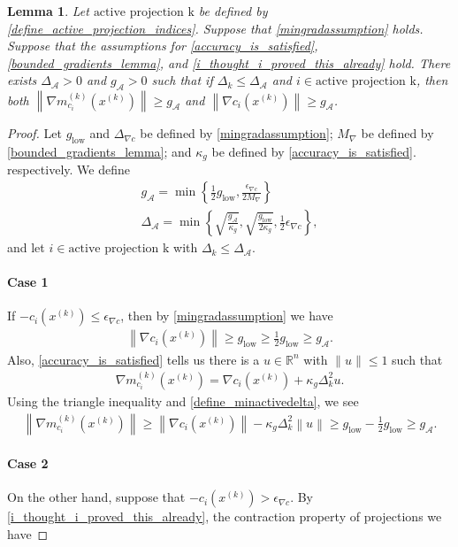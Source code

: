 \documentclass{article}
\newtheorem{lemma}[theorem]{Lemma}
\theoremstyle{case}
\numberwithin{theorem}{subsection}
\newcommand{\dk}{\Delta_k}
\newcommand{\gmcik}{{\nabla m_{c_i}^{(k)}\left(\xk\right)}}
\newcommand{\maxgrad}{{M_{\nabla}}}
\newcommand{\minactivegraddelta}{{\Delta_{\mathcal A}}}
\newcommand{\minactivegrad}{{ g_{\mathcal A} }}
\newcommand{\mingraddelta}{{\Delta_{\nabla c}}}
\newcommand{\mingradepsilon}{{\epsilon_{\nabla c}}}
\newcommand{\mingrad}{{ g_{\textrm{low}} }}
\newcommand{\Rn}{\mathbb R^n}
\newcommand{\xk}{x^{(k)}}
\newcommand{\activeprojk}{{\textrm{active projection k}}}
\begin{document}
\begin{lemma}
\label{active_gradients_bounded_below}
Let $\activeprojk$ be defined by \cref{define_active_projection_indices}.
Suppose that \cref{mingradassumption} holds.
Suppose that the assumptions for 
\cref{accuracy_is_satisfied}, \cref{bounded_gradients_lemma}, and \cref{i_thought_i_proved_this_already} hold.
There exists $\minactivegraddelta > 0$ and $\minactivegrad > 0$ such that if 
$\dk \le \minactivegraddelta$ and $i \in \activeprojk$, then both
$\left\|\gmcik\right\| \ge \minactivegrad$
and
$\left\|\nabla c_i\left(\xk\right)\right\| \ge \minactivegrad$.
\end{lemma}
\begin{proof}
Let 
$\mingrad$ and $\mingraddelta$
be defined by
\cref{mingradassumption};
$\maxgrad$ be defined by \cref{bounded_gradients_lemma};
and $\kappa_g$ be defined by \cref{accuracy_is_satisfied}.
respectively.
We define
\begin{align}
\minactivegrad = \min\left\{\frac 1 2 \mingrad, \frac {\mingradepsilon} {2 \maxgrad}  \right\} \label{define_minactivegrad} \\
\minactivegraddelta = \min\left\{\sqrt{\frac{\minactivegrad}{\kappa_g}}, \sqrt{\frac{\mingrad}{2\kappa_g}}, \frac 1 2 \mingradepsilon \right\}\label{define_minactivedelta}
,
\end{align}
and let $i \in \activeprojk$ with $\dk \le \minactivegraddelta$.
\paragraph{Case 1}
If $-c_i\left(\xk\right) \le \mingradepsilon$, then by \cref{mingradassumption} we have 
\begin{align*}
\left\|\nabla c_i\left(\xk\right)\right\| \ge \mingrad \ge \frac 1 2 \mingrad \ge \minactivegrad.
\end{align*}
Also, \cref{accuracy_is_satisfied} tells us there is a $u \in \Rn$ with $\|u\| \le 1$ such that
\begin{align}
\gmcik = \nabla c_i\left(\xk\right) + \kappa_g \dk^2 u. \label{mag_acc}
\end{align}
Using the triangle inequality and \cref{define_minactivedelta}, we see
\begin{align*}
\left\|\gmcik \right\| \ge \left\|\nabla c_i\left(\xk\right)\right\| - \kappa_g \dk^2 \left\|u\right\|
\ge \mingrad - \frac 1 2 \mingrad \ge \minactivegrad.
\end{align*}

\paragraph{Case 2}
On the other hand, suppose that $-c_i\left(\xk\right) > \mingradepsilon$.
By \cref{i_thought_i_proved_this_already}, the contraction property of projections we have


\end{proof}
\end{document}
